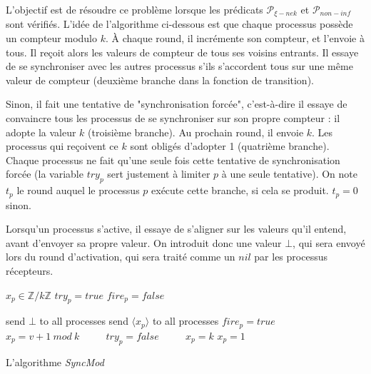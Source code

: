 \documentclass{article}
\begin{document}
L'objectif est de résoudre ce problème lorsque les prédicats $\mathcal{P}_{\xi-nek}$ et $\mathcal{P}_{non-inf}$ sont vérifiés.
L'idée de l'algorithme ci-dessous est que chaque processus possède un compteur modulo $k$. À chaque round, il incrémente son compteur, et l'envoie à tous.
Il reçoit alors les valeurs de compteur de tous ses voisins entrants. Il essaye de se synchroniser avec les autres processus s'ils s'accordent tous sur une même valeur de compteur
(deuxième branche dans la fonction de transition).

Sinon, il fait une tentative de "synchronisation forcée", c'est-à-dire il essaye de convaincre tous les processus de se synchroniser sur son propre compteur :
il adopte la valeur $k$ (troisième branche). Au prochain round, il envoie $k$.  Les processus qui reçoivent ce $k$ sont obligés d'adopter 1 (quatrième branche).
Chaque processus ne fait qu'une seule fois cette tentative de synchronisation forcée (la variable $try_p$ sert justement à limiter $p$ à une seule tentative).
On note $t_p$ le round auquel le processus $p$ exécute cette branche, si cela se produit. $t_p = 0$ sinon.

Lorsqu'un processus s'active, il essaye de s'aligner sur les valeurs qu'il entend, avant d'envoyer sa propre valeur.
On introduit donc une valeur $\bot$, qui sera envoyé lors du round d'activation, qui sera traité comme un $nil$ par les processus récepteurs.

\pagebreak[1]

\begin{algorithm}[htb]
\begin{distribalgo}[1]
\BLANK {}
	\STATE $x_p \in \mathds{Z}/k\mathds{Z}$
	\STATE $try_p = true$
	\STATE $fire_p = false$

\ENDINDENT \BLANK

    \STATE send $\bot$ to all processes
  \ENDINDENT
\ENDINDENT
  \BLANK
{}
    \STATE send $\langle x_p \rangle$ to all processes
  \ENDINDENT
\ENDINDENT
  \BLANK
{}
	\STATE $fire_p = true$ ~~~~
	\ENDIF
	\STATE $x_p = v+1~mod~k$ ~~~~
	\STATE $try_p = false$ ~~~~
	\STATE $x_p = k$
	\ELSE
	\STATE $x_p = 1$ ~~~~
	\ENDIF
  \ENDINDENT
\ENDINDENT 
\caption{L'algorithme {\em SyncMod}} \label{algo:R}
\end{distribalgo}

\end{algorithm}
\end{document}
